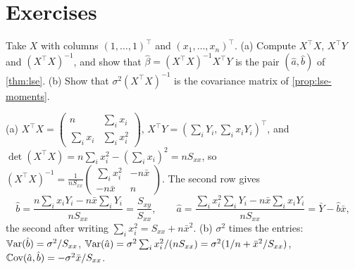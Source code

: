 \section{Exercises}
\label{sec:mreg-exercises}

\begin{exercise}
\label{ex:mreg-onepred}
Take $X$ with columns $(1, \ldots, 1)^\top$ and $(x_1, \ldots, x_n)^\top$. (a) Compute $X^\top X$, $X^\top Y$ and $(X^\top X)^{-1}$, and show that $\hat{\beta} = (X^\top X)^{-1}X^\top Y$ is the pair $(\hat{a}, \hat{b})$ of \cref{thm:lse}. (b) Show that $\sigma^2(X^\top X)^{-1}$ is the covariance matrix of \cref{prop:lse-moments}.
\end{exercise}
\begin{solution}
(a) $X^\top X = \begin{pmatrix} n & \sum_i x_i \\ \sum_i x_i & \sum_i x_i^2\end{pmatrix}$, $X^\top Y = (\sum_i Y_i, \sum_i x_iY_i)^\top$, and $\det(X^\top X) = n\sum_i x_i^2 - (\sum_i x_i)^2 = nS_{xx}$, so $(X^\top X)^{-1} = \frac{1}{nS_{xx}}\begin{pmatrix} \sum_i x_i^2 & -n\bar{x} \\ -n\bar{x} & n\end{pmatrix}$. The second row gives
\[
\hat{b} = \frac{n\sum_i x_iY_i - n\bar{x}\sum_i Y_i}{nS_{xx}} = \frac{S_{xy}}{S_{xx}}, \qquad \hat{a} = \frac{\sum_i x_i^2\sum_i Y_i - n\bar{x}\sum_i x_iY_i}{nS_{xx}} = \bar{Y} - \hat{b}\bar{x},
\]
the second after writing $\sum_i x_i^2 = S_{xx} + n\bar{x}^2$. (b) $\sigma^2$ times the entries: $\operatorname*{\mathbb{V}\text{ar}}(\hat{b}) = \sigma^2/S_{xx}$, $\operatorname*{\mathbb{V}\text{ar}}(\hat{a}) = \sigma^2\sum_i x_i^2/(nS_{xx}) = \sigma^2(1/n + \bar{x}^2/S_{xx})$, $\operatorname*{\mathbb{C}\text{ov}}(\hat{a}, \hat{b}) = -\sigma^2\bar{x}/S_{xx}$.
\end{solution}

